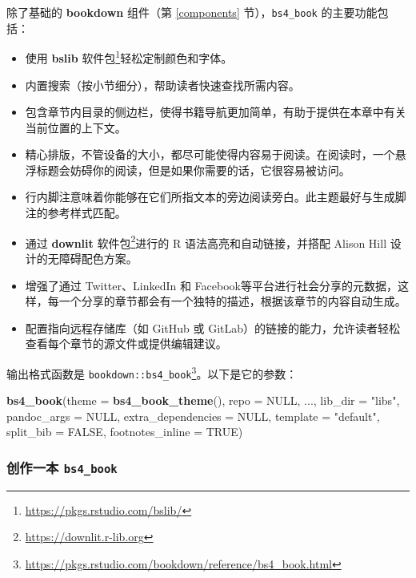 \documentclass[
  12pt,
]{krantz}
\newenvironment{Shaded}{\begin{snugshade}}{\end{snugshade}}
\newcommand{\AttributeTok}[1]{\textcolor[rgb]{0.13,0.29,0.53}{#1}}
\newcommand{\ConstantTok}[1]{\textcolor[rgb]{0.56,0.35,0.01}{#1}}
\newcommand{\FunctionTok}[1]{\textcolor[rgb]{0.13,0.29,0.53}{\textbf{#1}}}
\newcommand{\NormalTok}[1]{#1}
\newcommand{\StringTok}[1]{\textcolor[rgb]{0.31,0.60,0.02}{#1}}
\renewcommand{\href}[2]{#2\footnote{\url{#1}}}
\theoremstyle{definition}
\theoremstyle{definition}
\theoremstyle{definition}
\theoremstyle{definition}
\theoremstyle{remark}
\begin{document}
除了基础的 \textbf{bookdown} 组件（第 \ref{components} 节），\texttt{bs4\_book} 的主要功能包括：

\begin{itemize}
\item
  使用 \href{https://pkgs.rstudio.com/bslib/}{\textbf{bslib} 软件包}轻松定制颜色和字体。
\item
  内置搜索（按小节细分），帮助读者快速查找所需内容。
\item
  包含章节内目录的侧边栏，使得书籍导航更加简单，有助于提供在本章中有关当前位置的上下文。
\item
  精心排版，不管设备的大小，都尽可能使得内容易于阅读。在阅读时，一个悬浮标题会妨碍你的阅读，但是如果你需要的话，它很容易被访问。
\item
  行内脚注意味着你能够在它们所指文本的旁边阅读旁白。此主题最好与生成脚注的参考样式匹配。
\item
  通过 \href{https://downlit.r-lib.org}{\textbf{downlit} 软件包}进行的 R 语法高亮和自动链接，并搭配 Alison Hill 设计的无障碍配色方案。
\item
  增强了通过 Twitter、LinkedIn 和 Facebook等平台进行社会分享的元数据，这样，每一个分享的章节都会有一个独特的描述，根据该章节的内容自动生成。
\item
  配置指向远程存储库（如 GitHub 或 GitLab）的链接的能力，允许读者轻松查看每个章节的源文件或提供编辑建议。
\end{itemize}

输出格式函数是 \href{https://pkgs.rstudio.com/bookdown/reference/bs4_book.html}{\texttt{bookdown::bs4\_book}}。以下是它的参数：

\begin{Shaded}
\begin{Highlighting}[]
\FunctionTok{bs4\_book}\NormalTok{(}\AttributeTok{theme =} \FunctionTok{bs4\_book\_theme}\NormalTok{(), }\AttributeTok{repo =} \ConstantTok{NULL}\NormalTok{, ...,}
  \AttributeTok{lib\_dir =} \StringTok{"libs"}\NormalTok{, }\AttributeTok{pandoc\_args =} \ConstantTok{NULL}\NormalTok{,}
  \AttributeTok{extra\_dependencies =} \ConstantTok{NULL}\NormalTok{, }\AttributeTok{template =} \StringTok{"default"}\NormalTok{,}
  \AttributeTok{split\_bib =} \ConstantTok{FALSE}\NormalTok{, }\AttributeTok{footnotes\_inline =} \ConstantTok{TRUE}\NormalTok{)}
\end{Highlighting}
\end{Shaded}

\hypertarget{ux521bux4f5cux4e00ux672c-bs4_book}{%
\subsubsection{\texorpdfstring{创作一本 \texttt{bs4\_book}}{创作一本 bs4\_book}}\label{ux521bux4f5cux4e00ux672c-bs4_book}}
\end{document}
